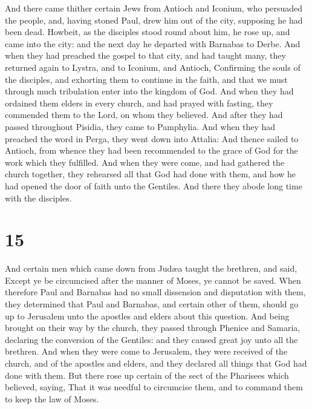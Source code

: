  And there came thither certain Jews from Antioch and
Iconium, who persuaded the people, and, having stoned Paul, drew him out
of the city, supposing he had been dead.  Howbeit, as the
disciples stood round about him, he rose up, and came into the city: and
the next day he departed with Barnabas to Derbe.  And
when they had preached the gospel to that city, and had taught many,
they returned again to Lystra, and to Iconium, and Antioch,
 Confirming the souls of the disciples, and exhorting
them to continue in the faith, and that we must through much tribulation
enter into the kingdom of God.  And when they had
ordained them elders in every church, and had prayed with fasting, they
commended them to the Lord, on whom they believed.  And
after they had passed throughout Pisidia, they came to Pamphylia.
 And when they had preached the word in Perga, they went
down into Attalia:  And thence sailed to Antioch, from
whence they had been recommended to the grace of God for the work which
they fulfilled.  And when they were come, and had
gathered the church together, they rehearsed all that God had done with
them, and how he had opened the door of faith unto the Gentiles.
 And there they abode long time with the disciples.

\hypertarget{section-14}{%
\section{15}\label{section-14}}

 And certain men which came down from Judæa taught the
brethren, and said, Except ye be circumcised after the manner of Moses,
ye cannot be saved.  When therefore Paul and Barnabas had
no small dissension and disputation with them, they determined that Paul
and Barnabas, and certain other of them, should go up to Jerusalem unto
the apostles and elders about this question.  And being
brought on their way by the church, they passed through Phenice and
Samaria, declaring the conversion of the Gentiles: and they caused great
joy unto all the brethren.  And when they were come to
Jerusalem, they were received of the church, and of the apostles and
elders, and they declared all things that God had done with them.
 But there rose up certain of the sect of the Pharisees
which believed, saying, That it was needful to circumcise them, and to
command them to keep the law of Moses.

